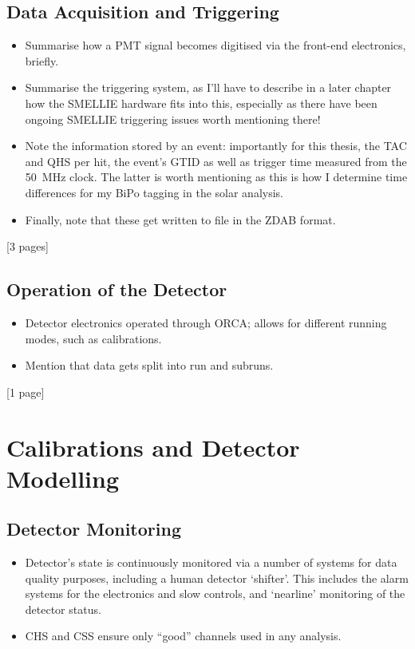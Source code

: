 {    \subsection{Data Acquisition and Triggering}
    \begin{itemize}
        \item Summarise how a PMT signal becomes digitised via the front-end electronics, briefly.
        \item Summarise the triggering system, as I'll have to describe in a later chapter how the SMELLIE hardware fits into this, especially as there have been ongoing SMELLIE triggering issues worth mentioning there!
        \item Note the information stored by an event: importantly for this thesis, the TAC and QHS per hit, the event's GTID as well as trigger time measured from the \SI{50}{\mega\Hz} clock. The latter is worth mentioning as this is how I determine time differences for my BiPo tagging in the solar analysis.
        \item Finally, note that these get written to file in the ZDAB format.
    \end{itemize}
    [3 pages]
    \subsection{Operation of the Detector}
    \begin{itemize}
        \item Detector electronics operated through ORCA; allows for different running modes, such as calibrations.
        \item Mention that data gets split into run and subruns.
    \end{itemize}
    [1 page]
    \section{Calibrations and Detector Modelling}
    \subsection{Detector Monitoring}
    \begin{itemize}
        \item Detector's state is continuously monitored via a number of systems for data quality purposes, including a human detector `shifter'. This includes the alarm systems for the electronics and slow controls, and `nearline' monitoring of the detector status.
        \item CHS and CSS ensure only ``good'' channels used in any analysis.
    \end{itemize}
}
